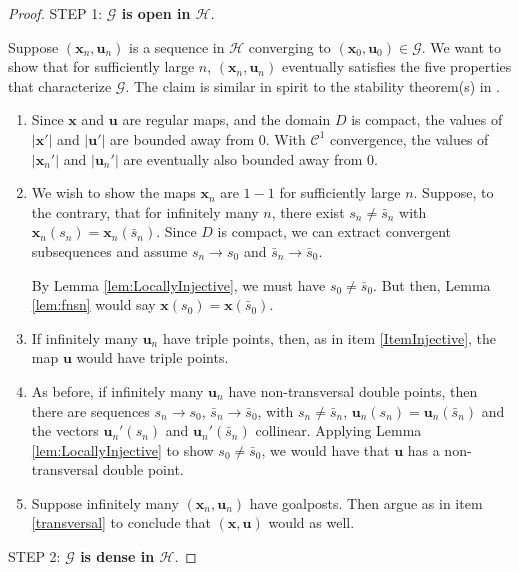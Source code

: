 \documentclass[12pt]{article}
\numberwithin{equation}{subsection}
\theoremstyle{definition}
\numberwithin{lem}{section}
\def\vecu{\mathbf{u}}
\def\uu{\mathbf{u}}
\def\vecx{\mathbf{x}}
\def\x{\mathbf{x}}
\def\xun{(\vecx_n,\vecu_n)}
\def\xn{\mathbf{x}_n}
\def\un{\uu_n}
\def\bsn{\bar{s}_n}
\def\bso{\bar{s}_0}
\def\C{\mathcal{C}}
\def\G{\mathcal{G}}
\def\H{\mathcal{H}}
\begin{document}
\begin{proof}
STEP 1: {\bf{$\G$ is open in $\H$}}.

Suppose $(\vecx_n, \vecu_n)$ is a sequence in $\H$ converging to $(\vecx_0, \vecu_0) \in \G$. We want to show that for sufficiently large $n$, $\xun$ eventually satisfies the five properties that characterize $\G$.  The claim is similar in spirit to the stability theorem(s) in \cite{GP74}.

\begin{enumerate}
\item
Since $\x$ and $\uu$ are regular maps, and the domain $D$ is compact, the values of $|\x'|$ and $|\uu'|$ are  bounded away from $0$. With $\C^1$ convergence, the values of $|\xn'|$ and $|\un'|$ are eventually also bounded away from $0$.

\item 
\label{ItemInjective}
We wish to show the maps $\xn$ are $1-1$ for sufficiently large $n$. Suppose, to the contrary, that for infinitely many  $n$, there exist $s_n \neq \bsn$ with $\xn(s_n)=\xn(\bsn)$. Since $D$ is compact, we can extract convergent subsequences and assume $s_n \to s_0$ and $\bsn\to \bso$.

By Lemma \ref{lem:LocallyInjective}, we must have $s_0 \neq \bso$. But then,  Lemma \ref{lem:fnsn} would say $\x(s_0)=\x(\bso)$.

\item 
If infinitely many $\un$ have triple points, then, as in item \ref{ItemInjective}, the map $\vecu$ would have triple points.

\item
\label{transversal}
As before, if infinitely many $\un$ have non-transversal double points, then there are sequences $s_n \to s_0$, $\bsn \to \bso$, with $s_n \neq \bsn$, $\un(s_n)=\un(\bsn)$ and the vectors $\un'(s_n)$ and $\un'(\bsn)$ collinear. Applying Lemma \ref{lem:LocallyInjective} to show $s_0 \neq \bso$, we would have that $\vecu$ has a non-transversal double point.

\item Suppose infinitely many $\xun$ have goalposts. Then argue as in  item \ref{transversal} to conclude that   $(\vecx,\vecu)$ would as well.

\end{enumerate}

STEP 2: {\bf{$\G$ is dense in $\H$}}. 


\end{proof}
\end{document}
